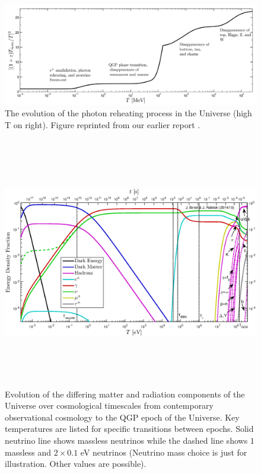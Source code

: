 \documentclass[universe,article,submit,moreauthors,pdftex,a4paper]{Definitions/mdpi}
\begin{document}
\begin{figure}[h]
  \centering
  \includegraphics[width=\linewidth]{./degrees_of_freedom}
  \caption{The evolution of the photon reheating process in the Universe (high T on right). Figure reprinted from our earlier report \cite{Rafelski:2013yka}.}
  \label{degrees_of_freedom} 
\end{figure}
\begin{figure}
  \centerline{\hspace*{0.4cm}\includegraphics[height=11cm]{./plots/energy_fractions.eps}}
  \caption{Evolution of the differing matter and radiation components of the Universe over cosmological timescales from contemporary observational cosmology to the QGP epoch of the Universe. Key temperatures are listed for specific transitions between epochs. Solid neutrino line shows massless neutrinos while the dashed line shows $1$ massless and $2\times 0.1$ eV neutrinos (Neutrino mass choice is just for illustration.  Other values are possible). \label{CosmicFraction}}
\end{figure}
\end{document}

